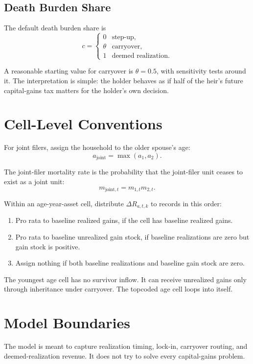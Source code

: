 \documentclass[11pt]{article}
\newcommand{\dR}{\Delta R}
\begin{document}
\subsection{Death Burden Share}

The default death burden share is
\[
c =
\begin{cases}
0 & \text{step-up},\\
\theta & \text{carryover},\\
1 & \text{deemed realization}.
\end{cases}
\]

A reasonable starting value for carryover is $\theta=0.5$, with sensitivity
tests around it. The interpretation is simple: the holder behaves as if half
of the heir's future capital-gains tax matters for the holder's own decision.

\section{Cell-Level Conventions}

For joint filers, assign the household to the older spouse's age:
\[
a_{\mathrm{joint}}=\max(a_1,a_2).
\]

The joint-filer mortality rate is the probability that the joint-filer unit
ceases to exist as a joint unit:
\[
m_{\mathrm{joint},t}=m_{1,t}m_{2,t}.
\]

Within an age-year-asset cell, distribute $\dR_{a,t,k}$ to records in this
order:

\begin{enumerate}
  \item Pro rata to baseline realized gains, if the cell has baseline
        realized gains.
  \item Pro rata to baseline unrealized gain stock, if baseline realizations
        are zero but gain stock is positive.
  \item Assign nothing if both baseline realizations and baseline gain stock
        are zero.
\end{enumerate}

The youngest age cell has no survivor inflow. It can receive unrealized gains
only through inheritance under carryover. The topcoded age cell loops into
itself.

\section{Model Boundaries}

The model is meant to capture realization timing, lock-in, carryover routing,
and deemed-realization revenue. It does not try to solve every capital-gains
problem.
\end{document}
